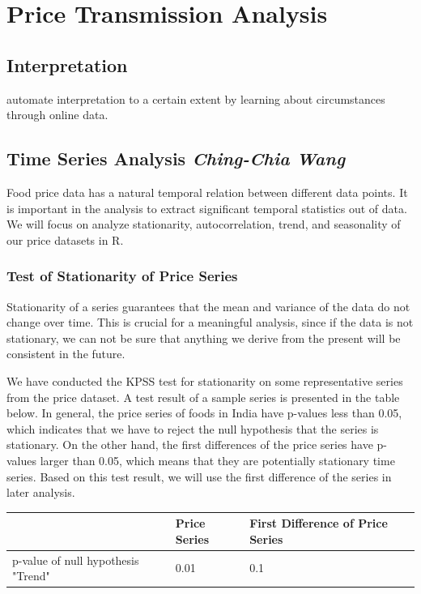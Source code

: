 \section*{Price Transmission Analysis}

\subsection*{Interpretation}
automate interpretation to a certain extent by learning about circumstances through online data.

\subsection*{Time Series Analysis \footnotesize\textit{Ching-Chia Wang}}
Food price data has a natural temporal relation between different data points. It is important in the analysis to extract significant temporal statistics out of data. We will focus on analyze stationarity, autocorrelation, trend, and seasonality of our price datasets in R.

\subsubsection*{Test of Stationarity of Price Series}
Stationarity of a series guarantees that the mean and variance of the data do not change over time. This is crucial for a meaningful analysis, since if the data is not stationary, we can not be sure that anything we derive from the present will be consistent in the future.

We have conducted the KPSS test for stationarity on some representative series from the price dataset. A test result of a sample series is presented in the table below. In general, the price series of foods in India have p-values less than 0.05, which indicates that we have to reject the null hypothesis that the series is stationary. On the other hand, the first differences of the price series have p-values larger than 0.05, which means that they are potentially stationary time series. Based on this test result, we will use the first difference of the series in later analysis.

\begin{table}[h]
\begin{tabular}{|l|l|l|}
\hline
\hspace{5pt} & Price Series & First Difference of Price Series \\ \hline
p-value of null hypothesis "Trend" & 0.01 & 0.1\\ \hline
\end{tabular}
\label{table:kpss}
\end{table}

